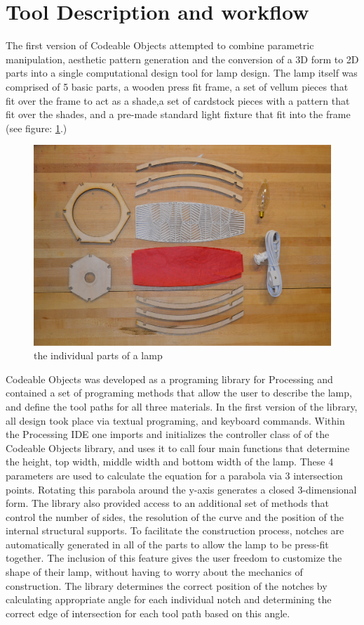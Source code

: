\section{Tool Description and workflow}
The first version of Codeable Objects attempted to combine parametric manipulation, aesthetic pattern generation and the conversion of a 3D form to 2D parts into a single computational design tool for lamp design. The lamp itself was comprised of 5 basic parts, a wooden press fit frame, a set of vellum pieces that fit over the frame to act as a shade,a set of cardstock pieces with a pattern that fit over the shades, and a pre-made standard light fixture that fit into the frame (see figure: \ref{fig:lamp_parts}.)
\begin{center}
\begin{figure}[h!]
\includegraphics[width=6.5in]{images/parts.png}
\caption{the individual parts of a lamp}
\label{fig:lamp_parts}
\end{figure}
\end{center}
Codeable Objects was developed as a programing library for Processing and contained a set of programing methods that allow the user to describe the lamp, and define the tool paths for all three materials. In the first version of the library, all design took place via textual programing, and keyboard commands.  Within the Processing IDE one imports and initializes the controller class of of the Codeable Objects library, and uses it to call four main functions that determine the height, top width, middle width and bottom width of the lamp. These 4 parameters are used to calculate the equation for a parabola via 3 intersection points. Rotating this parabola around the y-axis generates a closed 3-dimensional form.  The library also provided access to an additional set of methods that control the number of sides, the resolution of the curve and the position of the internal structural supports. To facilitate the construction process, notches are automatically generated in all of the parts to allow the lamp to be press-fit together. The inclusion of this feature gives the user freedom to customize the shape of their lamp, without having to worry about the mechanics of construction. The library determines the correct position of the notches by calculating appropriate angle for each individual notch and determining the correct edge of intersection for each tool path based on this angle.  

